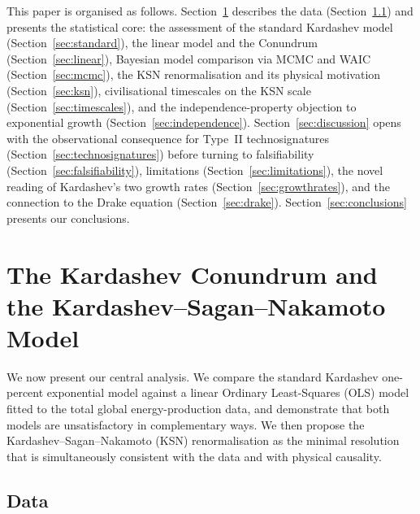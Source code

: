 This paper is organised as follows. Section~\ref{sec:analysis} describes the data
(Section~\ref{sec:data}) and presents the statistical core: the assessment of the
standard Kardashev model (Section~\ref{sec:standard}), the linear model and the
Conundrum (Section~\ref{sec:linear}), Bayesian model comparison via MCMC and WAIC
(Section~\ref{sec:mcmc}), the KSN renormalisation and its physical motivation
(Section~\ref{sec:ksn}), civilisational timescales on the KSN scale
(Section~\ref{sec:timescales}), and the independence-property objection to exponential
growth (Section~\ref{sec:independence}). Section~\ref{sec:discussion} opens with the
observational consequence for Type~II technosignatures
(Section~\ref{sec:technosignatures}) before turning to falsifiability
(Section~\ref{sec:falsifiability}), limitations (Section~\ref{sec:limitations}), the
novel reading of Kardashev's two growth rates (Section~\ref{sec:growthrates}), and the
connection to the Drake equation (Section~\ref{sec:drake}).
Section~\ref{sec:conclusions} presents our conclusions.

\section{The Kardashev Conundrum and the Kardashev--Sagan--Nakamoto Model}
\label{sec:analysis}

We now present our central analysis. We compare the standard Kardashev one-percent
exponential model against a linear Ordinary Least-Squares (OLS) model fitted to the
total global energy-production data, and demonstrate that both models are unsatisfactory
in complementary ways. We then propose the Kardashev--Sagan--Nakamoto (KSN)
renormalisation as the minimal resolution that is simultaneously consistent with the
data and with physical causality.

\subsection{Data}
\label{sec:data}

